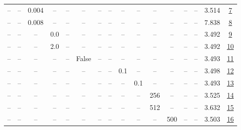 \begin{table}[H]
\begin{tabular}{cccccccccccccccc}
-- & -- & 0.004 & -- & -- & -- & -- & -- & -- & -- & -- & -- & -- & -- & 3.514 & \href{https://wandb.ai/marin-community/optimizer-scaling/runs/sweep-130m-2B-krone14983lr0.004-wd0.7-b10.95-plr0.2-pis1-gn1-nor-0f833d}{7} \\
-- & -- & 0.008 & -- & -- & -- & -- & -- & -- & -- & -- & -- & -- & -- & 7.838 & \href{https://wandb.ai/marin-community/optimizer-scaling/runs/sweep-130m-2B-kroncc6d1clr0.008-wd0.7-b10.95-plr0.2-pis1-gn1-nor-5daa90}{8} \\
-- & -- & -- & 0.0 & -- & -- & -- & -- & -- & -- & -- & -- & -- & -- & 3.492 & \href{https://wandb.ai/marin-community/optimizer-scaling/runs/sweep-130m-2B-kron42860dlr0.002-wd0.7-b10.95-plr0.2-pis1-gn0.0-n-66bad7}{9} \\
-- & -- & -- & 2.0 & -- & -- & -- & -- & -- & -- & -- & -- & -- & -- & 3.492 & \href{https://wandb.ai/marin-community/optimizer-scaling/runs/sweep-130m-2B-kron39ffb0lr0.002-wd0.7-b10.95-plr0.2-pis1-gn2.0-n-4e30bb}{10} \\
-- & -- & -- & -- & -- & False & -- & -- & -- & -- & -- & -- & -- & -- & 3.493 & \href{https://wandb.ai/marin-community/optimizer-scaling/runs/sweep-130m-2B-kron15f63alr0.002-wd0.7-b10.95-plr0.2-pis1-gn1-nor-c86fe3}{11} \\
-- & -- & -- & -- & -- & -- & -- & -- & 0.1 & -- & -- & -- & -- & -- & 3.498 & \href{https://wandb.ai/marin-community/optimizer-scaling/runs/sweep-130m-2B-krone65b57lr0.002-wd0.7-b10.95-plr0.1-pis1-gn1-nor-83c7e9}{12} \\
-- & -- & -- & -- & -- & -- & -- & -- & -- & 0.1 & -- & -- & -- & -- & 3.493 & \href{https://wandb.ai/marin-community/optimizer-scaling/runs/sweep-130m-2B-krone7ca20lr0.002-wd0.7-b10.95-plr0.2-pis1-gn1-nor-836663}{13} \\
-- & -- & -- & -- & -- & -- & -- & -- & -- & -- & 256 & -- & -- & -- & 3.525 & \href{https://wandb.ai/marin-community/optimizer-scaling/runs/sweep-130m-2B-kron6a290elr0.002-wd0.7-b10.95-plr0.2-pis1-gn1-nor-00e7d9}{14} \\
-- & -- & -- & -- & -- & -- & -- & -- & -- & -- & 512 & -- & -- & -- & 3.632 & \href{https://wandb.ai/marin-community/optimizer-scaling/runs/sweep-130m-2B-kronbe1c48lr0.002-wd0.7-b10.95-plr0.2-pis1-gn1-nor-6b988f}{15} \\
-- & -- & -- & -- & -- & -- & -- & -- & -- & -- & -- & 500 & -- & -- & 3.503 & \href{https://wandb.ai/marin-community/optimizer-scaling/runs/sweep-130m-2B-kron8b3feelr0.002-wd0.7-b10.95-plr0.2-pis1-gn1-nor-dac9d4}{16} \\

\end{tabular}
\end{table}
